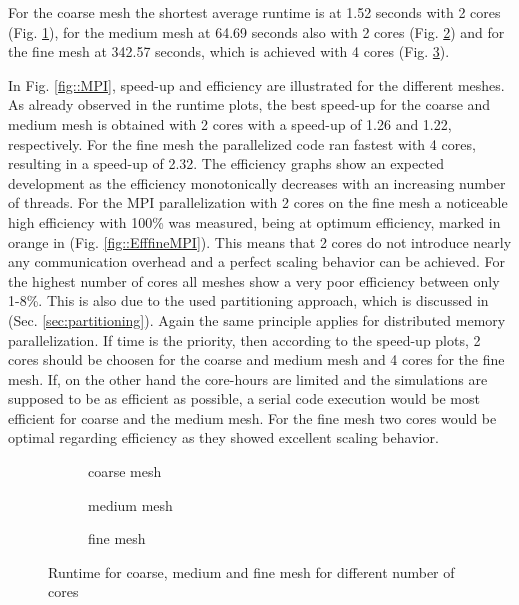 \documentclass[a4paper, 11pt, oneside]{scrartcl}
\newcommand{\refFig}[1]{Fig. \ref{#1}}
\newcommand{\refSec}[1]{Sec. \ref{#1}}
\begin{document}
For the coarse mesh the shortest average runtime is at 1.52 seconds with 2 cores (\refFig{fig::RcoarseMPI}), for the medium mesh at 64.69 seconds also with 2 cores (\refFig{fig::RmediumMPI}) and for the fine mesh at 342.57 seconds, which is achieved with 4 cores (\refFig{fig::RfineMPI}). 

In \refFig{fig::MPI}, speed-up and efficiency are illustrated for the different meshes. As already observed in the runtime plots, the best speed-up for the coarse and medium mesh is obtained with 2 cores with a speed-up of 1.26 and 1.22, respectively. For the fine mesh the parallelized code ran fastest with 4 cores, resulting in a speed-up of 2.32. The efficiency graphs show an expected development as the efficiency monotonically decreases with an increasing number of threads. For the MPI parallelization with 2 cores on the fine mesh a noticeable high efficiency with 100\% was measured, being at optimum efficiency, marked in orange in (\refFig{fig::EfffineMPI}). This means that 2 cores do not introduce nearly any communication overhead and a perfect scaling behavior can be achieved. 
For the highest number of cores all meshes show a very poor efficiency between only 1-8\%. This is also due to the used partitioning approach, which is discussed in (\refSec{sec:partitioning}).
Again the same principle applies for distributed memory parallelization. If time is the priority, then according to the speed-up plots, 2 cores should be choosen for the coarse and medium mesh and 4 cores for the fine mesh. If, on the other hand the core-hours are limited and the simulations are supposed to be as efficient as possible, a serial code execution would be most efficient for coarse and the medium mesh. For the fine mesh two cores would be optimal regarding efficiency as they showed excellent scaling behavior.
\begin{figure}[h!]
	\centering
	\begin{subfigure}{0.7\textwidth}
		\centering
		\resizebox{0.6\width}{!}{}
		\caption{\label{fig::RcoarseMPI} coarse mesh}
	\end{subfigure}
	\hfill
	\begin{subfigure}{0.7\textwidth}
		\centering
		\resizebox{0.6\width}{!}{}
		\caption{\label{fig::RmediumMPI} medium mesh}
	\end{subfigure}
	\hfill
	\begin{subfigure}{0.7\textwidth}
		\centering
		\resizebox{0.6\width}{!}{}
		\caption{\label{fig::RfineMPI} fine mesh}
	\end{subfigure}
	\caption{\label{fig::RuntimeMPI} Runtime for coarse, medium and fine mesh for different number of cores}
\end{figure}
\clearpage
\end{document}
